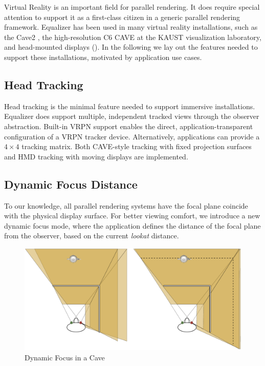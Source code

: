 Virtual Reality is an important field for parallel rendering. It does require
special attention to support it as a first-class citizen in a generic parallel
rendering framework. \textsf{Equalizer} has been used in many virtual reality
installations, such as the Cave2 \cite{FNTTL:13}, the high-resolution C6 CAVE
at the KAUST visualization laboratory, and head-mounted displays
(). In the following we lay out the features needed to support
these installations, motivated by application use cases.

\subsection{Head Tracking}

Head tracking is the minimal feature needed to support immersive installations.
\textsf{Equalizer} does support multiple, independent tracked views through the
observer abstraction. Built-in VRPN support enables the direct,
application-transparent configuration of a VRPN tracker device. Alternatively,
applications can provide a $4\times 4$ tracking matrix. Both CAVE-style tracking
with fixed projection surfaces and HMD tracking with moving displays are
implemented.

\subsection{Dynamic Focus Distance}

To our knowledge, all parallel rendering systems have the focal plane coincide
with the physical display surface. For better viewing comfort, we introduce a
new dynamic focus mode, where the application defines the distance of the focal
plane from the observer, based on the current \textit{lookat} distance.

\begin{figure}[h!t]\center
 \includegraphics[width=.9\textwidth]{images/focus}
 {\caption{\label{fFocus}Dynamic Focus in a Cave}}
\end{figure}


